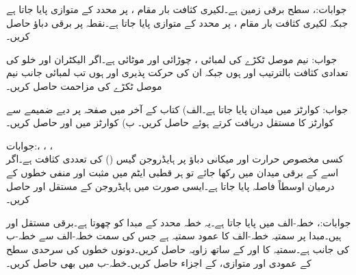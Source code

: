 جوابات:، 
سطح  برقی زمین ہے۔لکیری کثافت بار  مقام ،  پر  محدد کے متوازی پایا جاتا ہے جبکہ لکیری کثافت بار  مقام ،  پر  محدد کے متوازی پایا جاتا ہے۔نقطہ  پر برقی دباؤ حاصل کریں۔

جواب:
نیم موصل ٹکڑے کی لمبائی ، چوڑائی  اور موٹائی  ہے۔اگر الیکٹران اور خلو کی تعدادی کثافت بالترتیب  اور  ہوں جبکہ ان کی حرکت پذیری  اور  ہوں تب لمبائی جانب نیم موصل ٹکڑے کی مزاحمت حاصل کریں۔

جواب:
 کوارٹز میں  میدان پایا جاتا ہے۔الف) کتاب کے آخر میں صفحہ  پر دیے ضمیمے سے  کوارٹز  کا مستقل  دریافت کرتے ہوئے   حاصل کریں۔ ب)  کوارٹز  میں  اور  حاصل کریں۔

جوابات:، ، ، \\ 
کسی مخصوص حرارت اور میکانی دباؤ پر ہایڈروجن  گیس () کی تعددی کثافت  ہے۔اگر اسے  کے برقی میدان میں رکھا جائے تو ہر قطبی ایٹم  میں مثبت اور منفی خطوں کے درمیان اوسطاً  فاصلہ پایا جاتا ہے۔ایسی صورت میں ہایڈروجن کے مستقل  اور  حاصل کریں۔

جوابات:، 
خطہ-الف میں  پایا جاتا ہے۔یہ خطہ محدد کے مبدا کو چھوتا ہے۔برقی مستقل  اور  ہیں۔مبدا پر  سمتیہ  خطہ-الف کا عمود سمتیہ ہے جس کی سمت خطہ-الف سے خطہ-ب کی جانب ہے۔سمتیہ  کا اور    کے ساتھ زاویہ حاصل کریں۔دونوں خطوں کی  سرحدی سطح کے عمودی اور متوازی،  کے  اجزاء حاصل کریں۔خطہ-ب میں  بھی حاصل کریں۔

